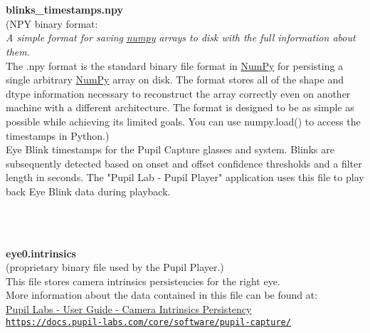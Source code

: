 \begin{description}
\begin{addmargin}[0em]{0em}
    \textbf{\\\\}
    \begin{addmargin}[1em]{0em} %
        \label{blinks_timestamps.npy}
        \textbf{blinks\_timestamps.npy}\\
        (NPY binary format:\\
        \textit{A simple format for saving}
        \href{https://numpy.org/doc/stable/reference/generated/numpy.lib.format.html#module-numpy.lib.format}{\textit{numpy}}
        \textit{arrays to disk with the full information about them.}\\
        The .npy format is the standard binary file format in 
        \href{https://numpy.org/doc/stable/reference/generated/numpy.lib.format.html#module-numpy.lib.format}{NumPy}
        for persisting a single arbitrary
        \href{https://numpy.org/doc/stable/reference/generated/numpy.lib.format.html#module-numpy.lib.format}{NumPy}
        array on disk. The format stores all of the shape and dtype information necessary to
        reconstruct the array correctly even on another machine with a different architecture.
        The format is designed to be as simple as possible while achieving its limited goals.
        You can use numpy.load() to access the timestamps in Python.)\\
        Eye Blink timestamps for the Pupil Capture glasses and system.
        Blinks are subsequently detected based on onset and offset confidence thresholds and a filter length in seconds.
        The "Pupil Lab - Pupil Player" application uses this file to play back Eye Blink data during playback.
    \end{addmargin} %

    \textbf{\\\\}
    \begin{addmargin}[1em]{0em} %
        \label{eye0.intrinsics}
        \textbf{eye0.intrinsics}\\(proprietary binary file used by the Pupil Player.)\\
        This file stores camera intrinsics persistencies for the right eye.\\
        More information about the data contained in this file can be found at:\\
        \href{https://docs.pupil-labs.com/core/software/pupil-capture/#camera-intrinsics-persistency}
        {{Pupil Labs - User Guide - Camera Intrinsics Persistency}\\\nolinkurl{https://docs.pupil-labs.com/core/software/pupil-capture/}}
    \end{addmargin} %


\end{addmargin}
\end{description}
